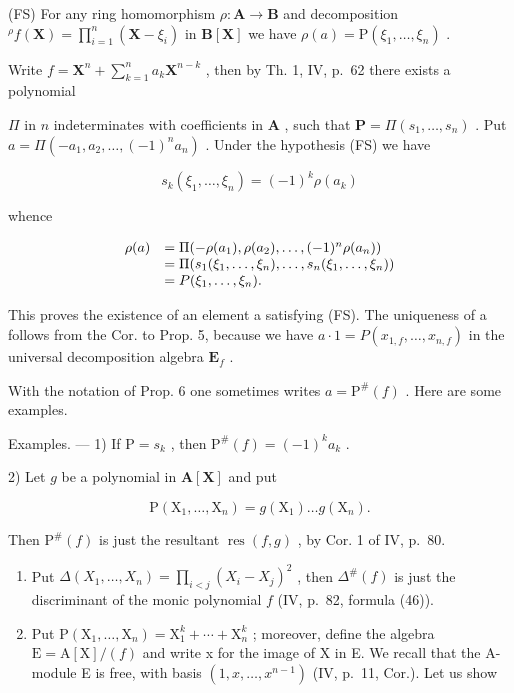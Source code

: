 (FS) For any ring homomorphism \(\rho: \mathbf{A} \to \mathbf{B}\) and decomposition \({}^{\rho} f(\mathbf{X}) = \prod_{i=1}^{n} (\mathbf{X} - \xi_i)\) in \(\mathbf{B}[\mathbf{X}]\) we have \(\rho(a) = \mathrm{P}(\xi_1, \ldots, \xi_n)\) .

Write \(f = \mathbf{X}^n + \sum_{k=1}^{n} a_k \mathbf{X}^{n-k}\) , then by Th. 1, IV, p.~62 there exists a polynomial

\(\Pi\) in \(n\) indeterminates with coefficients in \(\mathbf{A}\) , such that \(\mathbf{P} = \Pi(s_1, \ldots, s_n)\) . Put \(a = \Pi(-a_1, a_2, \ldots, (-1)^n a_n)\) . Under the hypothesis (FS) we have

\[
s _ {k} (\xi_ {1}, \dots , \xi_ {n}) = (- 1) ^ {k} \rho (a _ {k})
\]

whence

\[
\begin{array}{r l} \rho (a) & = \Pi (- \rho (a _ {1}), \rho (a _ {2}), \dots , (- 1) ^ {n} \rho (a _ {n})) \\ & = \Pi (s _ {1} (\xi_ {1}, \dots , \xi_ {n}), \dots , s _ {n} (\xi_ {1}, \dots , \xi_ {n})) \\ & = P (\xi_ {1}, \dots , \xi_ {n}). \end{array}
\]

This proves the existence of an element a satisfying (FS). The uniqueness of a follows from the Cor. to Prop. 5, because we have \(a \cdot 1 = P(x_{1,f}, \ldots, x_{n,f})\) in the universal decomposition algebra \(\mathbf{E}_f\) .

With the notation of Prop. 6 one sometimes writes \(a = \mathrm{P}^{\#}(f)\) . Here are some examples.

Examples. --- 1) If \(\mathrm{P} = s_k\) , then \(\mathrm{P}^{\#}(f) = (-1)^k a_k\) .

2) Let \(g\) be a polynomial in \(\mathbf{A}[\mathbf{X}]\) and put

\[
\mathrm{P} \left(\mathrm{X} _ {1}, \dots , \mathrm{X} _ {n}\right) = g \left(\mathrm{X} _ {1}\right) \dots g \left(\mathrm{X} _ {n}\right).
\]

Then \(\mathrm{P}^{\#}(f)\) is just the resultant \(\operatorname{res}(f, g)\) , by Cor. 1 of IV, p.~80.

\begin{enumerate}
\def\labelenumi{\arabic{enumi})}
\setcounter{enumi}{2}
\item
  Put \(\Delta(X_1, \ldots, X_n) = \prod_{i < j} (X_i - X_j)^2\) , then \(\Delta^{\#}(f)\) is just the discriminant of the monic polynomial \(f\) (IV, p.~82, formula (46)).
\item
  Put \(\mathrm{P}(\mathrm{X}_{1},\ldots,\mathrm{X}_{n})=\mathrm{X}_{1}^{k}+\cdots+\mathrm{X}_{n}^{k}\) ; moreover, define the algebra \(\mathrm{E}=\mathrm{A}[\mathrm{X}]/(f)\) and write x for the image of X in E. We recall that the A-module E is free, with basis \((1,x,\ldots,x^{n-1})\) (IV, p.~11, Cor.). Let us show
\end{enumerate}

